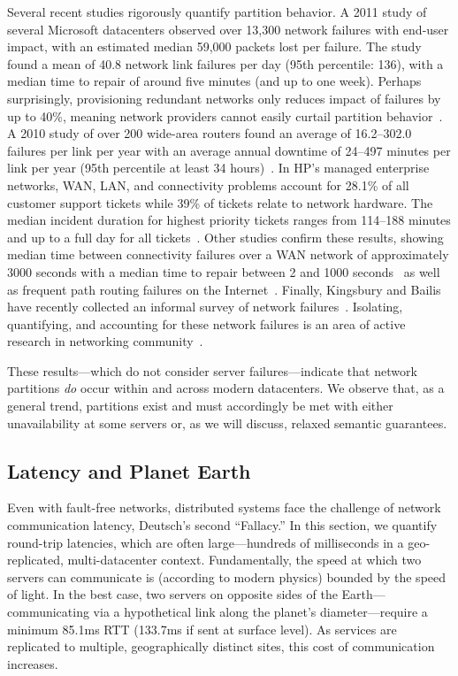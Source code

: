 Several recent studies rigorously quantify partition behavior. A 2011
study of several Microsoft datacenters observed over 13,300 network
failures with end-user impact, with an estimated median 59,000 packets
lost per failure. The study found a mean of 40.8 network link failures
per day (95th percentile: 136), with a median time to repair of around
five minutes (and up to one week). Perhaps surprisingly, provisioning
redundant networks only reduces impact of failures by up to 40\%,
meaning network providers cannot easily curtail partition
behavior~\cite{sigcomm-dc}. A 2010 study of over 200 wide-area routers
found an average of 16.2--302.0 failures per link per year with an
average annual downtime of 24--497 minutes per link per year (95th
percentile at least 34 hours)~\cite{sigcomm-wan}. In HP's managed
enterprise networks, WAN, LAN, and connectivity problems account for
28.1\% of all customer support tickets while 39\% of tickets relate to
network hardware.  The median incident duration for highest priority
tickets ranges from 114--188 minutes and up to a full day for all
tickets~\cite{turner2012failure}. Other studies confirm these results,
showing median time between connectivity failures over a WAN network
of approximately 3000 seconds with a median time to repair between 2
and 1000 seconds~\cite{ip-backbone-failures} as well as frequent path
routing failures on the Internet~\cite{labovitz-failures}. Finally,
Kingsbury and Bailis have recently collected an informal survey of
network failures~\cite{aphyr-post}. Isolating, quantifying, and
accounting for these network failures is an area of active research in
networking community~\cite{uw-failure-networks}.

These results---which do not consider server failures---indicate
that network partitions \textit{do} occur within and across modern
datacenters. We observe that, as a general trend, partitions exist and
must accordingly be met with either unavailability at some servers or,
as we will discuss, relaxed semantic guarantees.

\subsection{Latency and Planet Earth}
\label{sec:latency}

Even with fault-free networks, distributed systems face the challenge
of network communication latency, Deutsch's second ``Fallacy.'' In this
section, we quantify round-trip latencies, which are often
large---hundreds of milliseconds in a geo-replicated,
multi-datacenter context.  Fundamentally, the speed at which two
servers can communicate is (according to modern physics) bounded by
the speed of light. In the best case, two servers on opposite sides of
the Earth---communicating via a hypothetical link along the planet's
diameter---require a minimum 85.1ms RTT (133.7ms if sent at
surface level). As services are replicated to multiple, geographically
distinct sites, this cost of communication increases.


